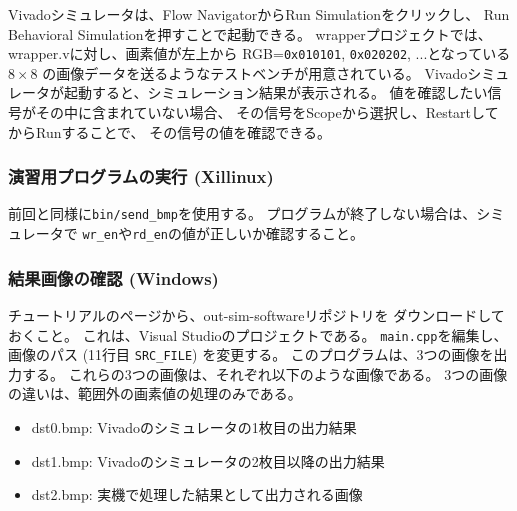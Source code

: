 \documentclass[11pt]{jsarticle}
\begin{document}
Vivadoシミュレータは、Flow NavigatorからRun Simulationをクリックし、
Run Behavioral Simulationを押すことで起動できる。
wrapperプロジェクトでは、wrapper.vに対し、画素値が左上から
RGB=\verb|0x010101|, \verb|0x020202|, ...となっている$8\!\times\!8$
の画像データを送るようなテストベンチが用意されている。
Vivadoシミュレータが起動すると、シミュレーション結果が表示される。
値を確認したい信号がその中に含まれていない場合、
その信号をScopeから選択し、RestartしてからRunすることで、
その信号の値を確認できる。

\subsubsection*{演習用プログラムの実行 (Xillinux)}
前回と同様に\verb|bin/send_bmp|を使用する。
プログラムが終了しない場合は、シミュレータで
\verb|wr_en|や\verb|rd_en|の値が正しいか確認すること。

\subsubsection*{結果画像の確認 (Windows)}
チュートリアルのページから、out-sim-softwareリポジトリを
ダウンロードしておくこと。
これは、Visual Studioのプロジェクトである。
\verb|main.cpp|を編集し、画像のパス (11行目 \verb|SRC_FILE|)
を変更する。
このプログラムは、3つの画像を出力する。
これらの3つの画像は、それぞれ以下のような画像である。
3つの画像の違いは、範囲外の画素値の処理のみである。
\begin{itemize}
	\item
		dst0.bmp: Vivadoのシミュレータの1枚目の出力結果
	\item
		dst1.bmp: Vivadoのシミュレータの2枚目以降の出力結果
	\item
		dst2.bmp: 実機で処理した結果として出力される画像
\end{itemize}
\end{document}
